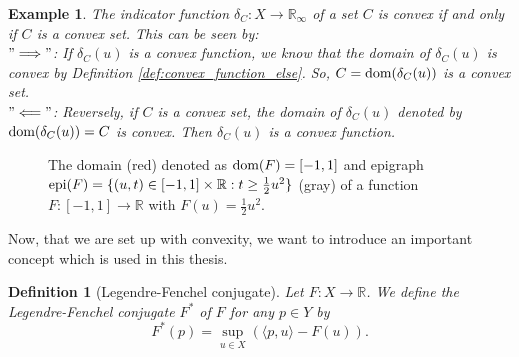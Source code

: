 \documentclass[abstracton]{scrreprt}
\newtheorem{definition}[theorem]{Definition}
\newtheorem{example}[theorem]{Example}
\begin{document}
        \begin{example}
            \label{ex:convex_function_reloaded}
            The indicator function $\delta_{C}: X \to \mathbb{R}_{\infty}$ of a set $C$ is convex if and only if $C$ is a convex set. This can be seen by:\\
            $"\Longrightarrow"$: If $\delta_{C}(u)$ is a convex function, we know that the domain of $\delta_{C}(u)$ is convex by Definition \ref{def:convex_function_else}. So, $C = \textnormal{dom}(\delta_{C}(u))$ is a convex set.\\
            $"\Longleftarrow"$: Reversely, if $C$ is a convex set, the domain of $\delta_{C}(u)$ denoted by $\textnormal{dom}(\delta_{C}(u)) = C$ is convex. Then $\delta_{C}(u)$ is a convex function.
        \end{example}
        \begin{figure}[!ht]
            \centering
            \caption[Domain and Epigraph.]{The domain (red) denoted as $\textnormal{dom}(F) = [-1, 1]$ and epigraph \\$\textnormal{epi}(F) = \{(u, t) \in [-1, 1] \times \mathbb{R} : t \ge \frac{1}{2}u^{2}\}$ (gray) of a function $F: [-1, 1] \longrightarrow \mathbb{R}$ with $F(u) = \frac{1}{2}u^{2}$.}
            \label{fig:domain_epigraph}
        \end{figure}
        Now, that we are set up with convexity, we want to introduce an important concept which is used in this thesis.
        \begin{definition}[Legendre-Fenchel conjugate] %
        \label{def:legendre_fenchel_conjugate}
            Let $F: X \longrightarrow \mathbb{R}$. We define the Legendre-Fenchel conjugate $F^{\ast}$ of $F$ for any $p \in Y$ by
                \begin{equation}
                    F^{\ast}(p) = \sup_{u \in X} \left( \langle p, u \rangle - F(u) \right).
                    \label{eq:legendre_fenchel_conjugate}
                \end{equation}
        \end{definition}
\end{document}
